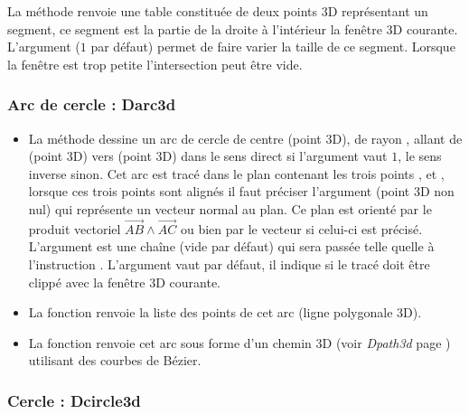La méthode  renvoie une table constituée de deux points 3D représentant un segment, ce segment est la partie de la droite  à l'intérieur la fenêtre 3D courante. L'argument  ($1$ par défaut) permet de faire varier la taille de ce segment. Lorsque la fenêtre est trop petite l'intersection peut être vide.

 \subsubsection{Arc de cercle : Darc3d}
 
\begin{itemize}
    \item La méthode  dessine un arc de cercle de centre  (point 3D), de rayon , allant de  (point 3D) vers  (point 3D) dans le sens direct si l'argument  vaut $1$, le sens inverse sinon. Cet arc est tracé dans le plan contenant les trois points ,  et , lorsque ces trois points sont alignés il faut préciser l'argument  (point 3D non nul) qui représente un vecteur normal au plan. Ce plan est orienté par le produit vectoriel $\vec{AB}\wedge\vec{AC}$ ou bien par le vecteur  si celui-ci est précisé. L'argument  est une chaîne (vide par défaut) qui sera passée telle quelle à l'instruction \drawcmd . L'argument  vaut \false par défaut, il indique si le tracé doit être clippé avec la fenêtre 3D courante.
    
    \item La fonction  renvoie la liste des points de cet arc (ligne polygonale 3D). 
    
    \item La fonction  renvoie cet arc sous forme d'un chemin 3D (voir \emph{Dpath3d} page \pageref{Dpath3d}) utilisant des courbes de Bézier.
\end{itemize}

\subsubsection{Cercle : Dcircle3d}

